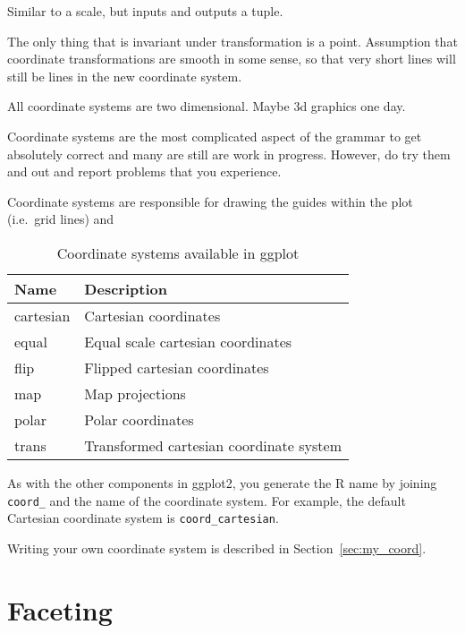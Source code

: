 Similar to a scale, but inputs and outputs a tuple.

The only thing that is invariant under transformation is a point.  Assumption that coordinate transformations are smooth in some sense, so that very short lines will still be lines in the new coordinate system.

All coordinate systems are two dimensional.  Maybe 3d graphics one day.

Coordinate systems are the most complicated aspect of the grammar to get absolutely correct and many are still are work in progress.  However, do try them and out and report problems that you experience.


Coordinate systems are responsible for drawing the guides within the plot (i.e.\ grid lines) and 

\begin{table}
  \begin{center}
  \begin{tabular}{ll}
    \toprule
    Name      & Description  \\
    \midrule
    cartesian & Cartesian coordinates                  \\
    equal     & Equal scale cartesian coordinates      \\
    flip      & Flipped cartesian coordinates          \\
    map       & Map projections                        \\
    polar     & Polar coordinates                      \\
    trans     & Transformed cartesian coordinate system\\
    \bottomrule
    
  \end{tabular}
  \end{center}
  \caption{Coordinate systems available in ggplot}
  \label{tbl:coord}
\end{table}

As with the other components in ggplot2, you generate the R name by joining {\tt coord\_} and the name of the coordinate system.  For example, the default Cartesian coordinate system is {\tt coord\_cartesian}.

Writing your own coordinate system is described in Section~\ref{sec:my_coord}.


\section{Faceting}
\label{sec:faceting}

